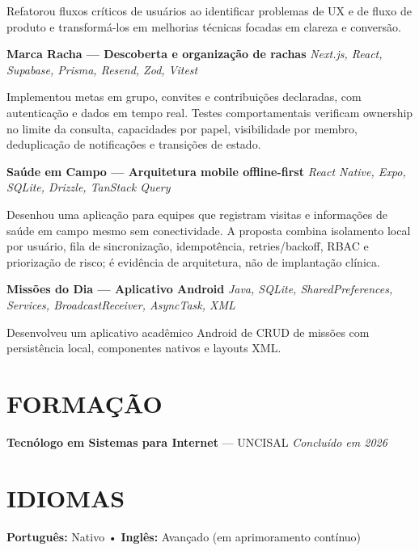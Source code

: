 \documentclass[10pt,a4paper]{article}
\begin{document}
\footnotesize

Refatorou fluxos críticos de usuários ao identificar problemas
de UX e de fluxo de produto e transformá-los em melhorias técnicas
focadas em clareza e conversão.

\vspace{0.5pt}

\noindent
\textbf{Marca Racha — Descoberta e organização de rachas}
\hfill
\textit{Next.js, React, Supabase, Prisma, Resend, Zod, Vitest}

\footnotesize

Implementou metas em grupo, convites e contribuições declaradas, com autenticação e dados em tempo real. Testes comportamentais verificam ownership no limite da consulta, capacidades por papel, visibilidade por membro, deduplicação de notificações e transições de estado.

\vspace{0.5pt}

\noindent
\textbf{Saúde em Campo — Arquitetura mobile offline-first}
\hfill
\textit{React Native, Expo, SQLite, Drizzle, TanStack Query}

\footnotesize

Desenhou uma aplicação para equipes que registram visitas e informações de saúde em campo mesmo sem conectividade. A proposta combina isolamento local por usuário, fila de sincronização, idempotência, retries/backoff, RBAC e priorização de risco; é evidência de arquitetura, não de implantação clínica.

\vspace{0.5pt}

\noindent
\textbf{Missões do Dia — Aplicativo Android}
\hfill
\textit{Java, SQLite, SharedPreferences, Services, BroadcastReceiver, AsyncTask, XML}

\footnotesize

Desenvolveu um aplicativo acadêmico Android de CRUD de missões com persistência local, componentes nativos e layouts XML.


\section*{FORMAÇÃO}

\noindent
\textbf{Tecnólogo em Sistemas para Internet} — UNCISAL
\hfill
\textit{Concluído em 2026}


\vspace{-2pt}
\section*{IDIOMAS}

\noindent
\textbf{Português:} Nativo
\quad • \quad
\textbf{Inglês:} Avançado (em aprimoramento contínuo)
\end{document}
